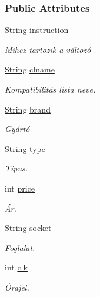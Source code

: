 \subsubsection*{Public Attributes}
\begin{DoxyCompactItemize}
\item 
\mbox{\hyperlink{class_string}{String}} \mbox{\hyperlink{struct_temp_input_a693f4a5b4215b51144174287aecab527}{instruction}}
\begin{DoxyCompactList}\small\item\em Mihez tartozik a változó \end{DoxyCompactList}\item 
\mbox{\hyperlink{class_string}{String}} \mbox{\hyperlink{struct_temp_input_a623b1fe5692319aad5c58cbc42bedf9c}{clname}}
\begin{DoxyCompactList}\small\item\em Kompatibilitás lista neve. \end{DoxyCompactList}\item 
\mbox{\hyperlink{class_string}{String}} \mbox{\hyperlink{struct_temp_input_ae61ec1c3c483e583e4975e5c728e4886}{brand}}
\begin{DoxyCompactList}\small\item\em Gyártó \end{DoxyCompactList}\item 
\mbox{\hyperlink{class_string}{String}} \mbox{\hyperlink{struct_temp_input_a1a73f4b9c84caa8c463a4bad03cf433d}{type}}
\begin{DoxyCompactList}\small\item\em Típus. \end{DoxyCompactList}\item 
int \mbox{\hyperlink{struct_temp_input_a6d049ee814f00b43e1d951317261e357}{price}}
\begin{DoxyCompactList}\small\item\em Ár. \end{DoxyCompactList}\item 
\mbox{\hyperlink{class_string}{String}} \mbox{\hyperlink{struct_temp_input_a5142af446776f87e454134511f681887}{socket}}
\begin{DoxyCompactList}\small\item\em Foglalat. \end{DoxyCompactList}\item 
int \mbox{\hyperlink{struct_temp_input_aa76fe14a614fef6e9239ce2283d6b102}{clk}}
\begin{DoxyCompactList}\small\item\em Órajel. \end{DoxyCompactList}\item 

\end{DoxyCompactItemize}
